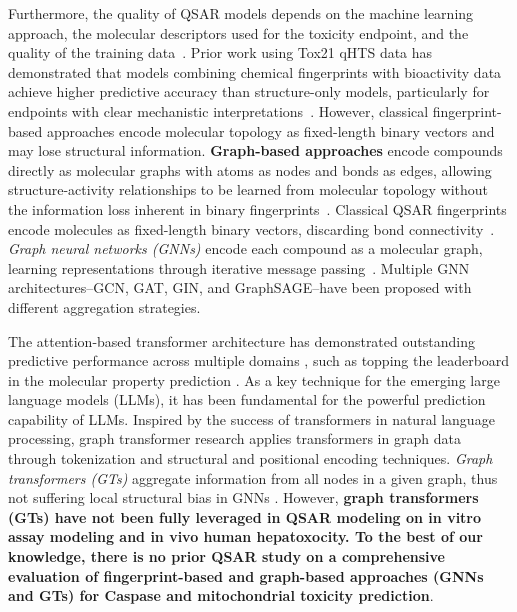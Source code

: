 \documentclass[letterpaper]{article}
\begin{document}


Furthermore, the quality of QSAR models depends on the machine learning approach, the molecular descriptors used for the toxicity endpoint, and the quality of the training data~\cite{Huang2009}. Prior work using Tox21 qHTS data has demonstrated that models combining chemical fingerprints with bioactivity data achieve higher predictive accuracy than structure-only models, particularly for endpoints with clear mechanistic interpretations~\cite{Huang2016,Mayr2016}. However, classical fingerprint-based approaches encode molecular topology as fixed-length binary vectors and may lose structural information. {\bf Graph-based approaches} encode compounds directly as molecular graphs with atoms as nodes and bonds as edges, allowing structure-activity relationships to be learned from molecular topology without the information loss inherent in binary fingerprints~\cite{Gilmer2017}.
Classical QSAR fingerprints encode molecules as fixed-length binary vectors, discarding bond connectivity~\cite{rogers2010extended}. \emph{Graph neural networks (GNNs)} encode each compound as a molecular graph, learning representations through iterative message passing~\cite{Gilmer2017}. Multiple GNN architectures--GCN, GAT, GIN, and GraphSAGE--have been proposed with different aggregation strategies. 

The attention-based transformer architecture has demonstrated outstanding predictive performance across multiple domains \cite{vaswani2017attention}, such as topping the leaderboard in the molecular property prediction \cite{masters2022gps++}. As a key technique for the emerging large language models (LLMs), it has been fundamental for the powerful prediction capability of LLMs. Inspired by the success of transformers in natural language processing, graph transformer research applies transformers in graph data through tokenization and structural and positional encoding techniques. \emph{Graph transformers (GTs)} aggregate information from all nodes in a given graph, thus not suffering local structural bias in GNNs \cite{muller2023attending}. However, {\bf graph transformers (GTs) have not been fully leveraged in QSAR modeling on in vitro assay modeling and in vivo human hepatoxocity. To the best of our knowledge, there is no prior QSAR study on a comprehensive evaluation of fingerprint-based and graph-based approaches (GNNs and GTs) for Caspase and mitochondrial toxicity prediction}.
\end{document}
